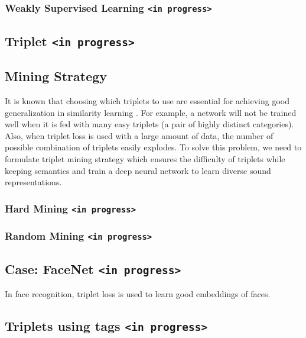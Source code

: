 \subsubsection*{Weakly Supervised Learning \texttt{<in progress>}}
\subsection{Triplet \texttt{<in progress>}}
\subsection{Mining Strategy}
 It is known that choosing which triplets to use are essential for achieving good generalization in similarity learning \cite{FaceNet}. For example, a network will not be trained well when it is fed with many easy triplets (a pair of highly distinct categories). Also, when triplet loss is used with a large amount of data, the number of possible combination of triplets easily explodes. To solve this problem, we need to formulate triplet mining strategy which ensures the difficulty of triplets  while keeping semantics and train a deep neural network to learn diverse sound representations. 


\subsubsection*{Hard Mining \texttt{<in progress>}}

\subsubsection*{Random Mining \texttt{<in progress>}}

\subsection{Case: FaceNet \texttt{<in progress>}}
In face recognition, triplet loss is used to learn good embeddings of faces.

\subsection{Triplets using tags \texttt{<in progress>}}

